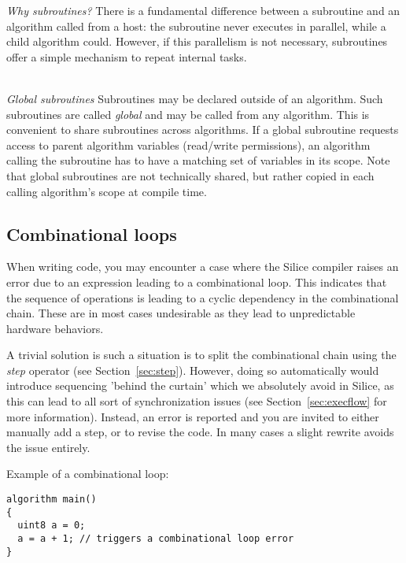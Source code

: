 \documentclass[a4]{article}
\newcommand\silice{Silice}
\begin{document}
\noindent \textit{Why subroutines?} There is a fundamental difference between a subroutine and an algorithm called from 
a host: the subroutine never executes in parallel, while a child algorithm could. However, if this parallelism is not necessary, 
subroutines offer a simple mechanism to repeat internal tasks.\\~

\noindent \textit{Global subroutines} Subroutines may be declared outside of an algorithm. Such subroutines are called \textit{global} and may be called from any algorithm. This is convenient to share subroutines across algorithms. If a global subroutine requests access to parent algorithm variables (read/write permissions), an algorithm calling the subroutine has to have a matching set of variables in its scope. Note that global subroutines are not technically shared, but rather copied in each calling algorithm's scope at compile time.


\subsection{Combinational loops}

When writing code, you may encounter a case where the \silice{} compiler
raises an error due to an expression leading to a combinational loop. This
indicates that the sequence of operations is leading to a cyclic dependency
in the combinational chain. These are in most
cases undesirable as they lead to unpredictable hardware behaviors.

A trivial solution is such a situation is to split the combinational chain
using the \textit{step} operator (see Section~\ref{sec:step}). However,
doing so automatically would introduce sequencing 'behind the curtain'
which we absolutely avoid in \silice{}, as this can lead to all sort of synchronization issues (see Section~\ref{sec:execflow} for more information). 
Instead, an error is reported and you are invited to either manually add
a step, or to revise the code. In many cases a slight rewrite avoids the
issue entirely.

\vspace*{2mm}
\noindent Example of a combinational loop:
\begin{verbatim}
algorithm main()
{
  uint8 a = 0;
  a = a + 1; // triggers a combinational loop error
}
\end{verbatim}
\end{document}
